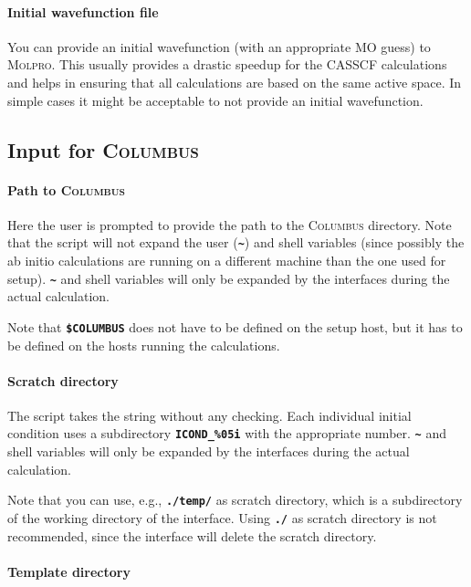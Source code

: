 \documentclass[a4paper,11pt,DIV=15,openany,twoside=false]{scrbook}
\newcommand{\ttt}[1]{\textbf{\texttt{#1}}}
\begin{document}
\paragraph{Initial wavefunction file}

You can provide an initial wavefunction (with an appropriate MO guess) to \textsc{Molpro}. This usually provides a drastic speedup for the CASSCF calculations and helps in ensuring that all calculations are based on the same active space. In simple cases it might be acceptable to not provide an initial wavefunction.

\subsection{Input for \textsc{Columbus}}

\paragraph{Path to \textsc{Columbus}}

Here the user is prompted to provide the path to the \textsc{Columbus} directory. Note that the script will not expand the user (\ttt{\textasciitilde}) and shell variables (since possibly the ab initio calculations are running on a different machine than the one used for setup). \ttt{\textasciitilde} and shell variables will only be expanded by the interfaces during the actual calculation.

Note that \ttt{\$COLUMBUS} does not have to be defined on the setup host, but it has to be defined on the hosts running the calculations.

\paragraph{Scratch directory}

The script takes the string without any checking. Each individual initial condition uses a subdirectory \ttt{ICOND\_\%05i} with the appropriate number. \ttt{\textasciitilde} and shell variables will only be expanded by the interfaces during the actual calculation.

Note that you can use, e.g., \ttt{./temp/} as scratch directory, which is a subdirectory of the working directory of the interface. Using \ttt{./} as scratch directory is not recommended, since the interface will delete the scratch directory.

\paragraph{Template directory}
\end{document}
